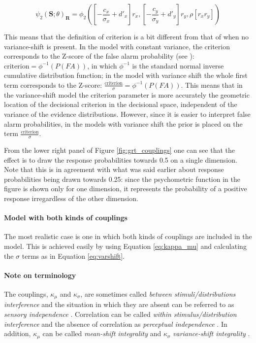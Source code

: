 \documentclass{article}\usepackage{knitr}
\begin{document}
\begin{equation}
\psi_2(\bm{S}; \theta)_{\bm{R}} = \phi_2([-\frac{c_x}{\sigma_x} + d'_x]r_x, [-\frac{c_y}{\sigma_y} + d'_y] r_y, \rho [r_x r_y])
\label{eq:generalPfun_varshift}
\end{equation}  

This means that the definition of criterion is a bit different from that of when no variance-shift is present. In the model with constant variance, the criterion corresponds to the Z-score of the false alarm probability (see \citet[Chapter 6]{kingdomprins2010}): $\text{criterion} = \phi^{-1}(P(FA))$, in which $\phi^{-1}$ is the standard normal inverse cumulative distribution function; in the model with variance shift the whole first term corresponds to the Z-score: $\frac{\text{criterion}}{\sigma} = \phi^{-1}(P(FA))$. This means that in the variance-shift model the criterion parameter is more accurately the geometric location of the decisional criterion in the decisional space, independent of the variance of the evidence distributions. However, since it is easier to interpret false alarm probabilities, in the models with variance shift the prior is placed on the term $\frac{\text{criterion}}{\sigma}$.

From the lower right panel of Figure \ref{fig:grt_couplings} one can see that the effect is to draw the response probabilities towards 0.5 on a single dimension. Note that this is in agreement with what was said earlier about response probabilities being drawn towards 0.25: since the psychometric function in the figure is shown only for one dimension, it represents the probability of a positive response irregardless of the other dimension. 

\paragraph{Model with both kinds of couplings}

The most realistic case is one in which both kinds of couplings are included in the model. This is achieved easily by using Equation \ref{eq:kappa_mu} and calculating the $\sigma$ terms as in Equation \ref{eq:varshift}.

\paragraph{Note on terminology} 

The couplings, $\kappa_{\mu}$ and $\kappa_{\sigma}$, are sometimes called \textit{between stimuli/distributions interference} \citep{silbert2009} and the situation in which they are absent can be referred to as \textit{sensory independence} \citep{ashby2015}. Correlation can be called \textit{within stimulus/distribution interference} \citep{silbert2009} and the absence of correlation as \textit{perceptual independence} \citep{ashby2015}. In addition, $\kappa_{\mu}$ can be called \textit{mean-shift integrality} and $\kappa_{\sigma}$ \textit{variance-shift integrality} \citep{ashby1994}.
\end{document}
